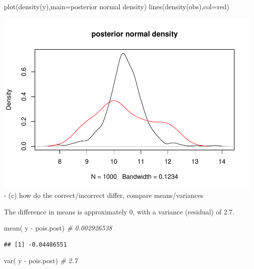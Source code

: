 \documentclass[
]{book}
\newenvironment{Shaded}{\begin{snugshade}}{\end{snugshade}}
\newcommand{\AttributeTok}[1]{\textcolor[rgb]{0.77,0.63,0.00}{#1}}
\newcommand{\CommentTok}[1]{\textcolor[rgb]{0.56,0.35,0.01}{\textit{#1}}}
\newcommand{\FunctionTok}[1]{\textcolor[rgb]{0.00,0.00,0.00}{#1}}
\newcommand{\NormalTok}[1]{#1}
\newcommand{\SpecialCharTok}[1]{\textcolor[rgb]{0.00,0.00,0.00}{#1}}
\newcommand{\StringTok}[1]{\textcolor[rgb]{0.31,0.60,0.02}{#1}}
\theoremstyle{definition}
\theoremstyle{definition}
\theoremstyle{definition}
\theoremstyle{definition}
\theoremstyle{remark}
\begin{document}
\begin{Shaded}
\begin{Highlighting}[]
  \FunctionTok{plot}\NormalTok{(}\FunctionTok{density}\NormalTok{(y),}\AttributeTok{main=}\StringTok{\textquotesingle{}posterior normal density\textquotesingle{}}\NormalTok{)}
  \FunctionTok{lines}\NormalTok{(}\FunctionTok{density}\NormalTok{(obs),}\AttributeTok{col=}\StringTok{\textquotesingle{}red\textquotesingle{}}\NormalTok{)}
\end{Highlighting}
\end{Shaded}

\includegraphics{_main_files/figure-latex/unnamed-chunk-40-2.pdf}
- (c) how do the correct/incorrect differ, compare means/variances

The difference in means is approximately 0, with a variance (residual) of 2.7.

\begin{Shaded}
\begin{Highlighting}[]
 \FunctionTok{mean}\NormalTok{( y }\SpecialCharTok{{-}}\NormalTok{ pois.post) }\CommentTok{\# 0.002926538}
\end{Highlighting}
\end{Shaded}

\begin{verbatim}
## [1] -0.04486551
\end{verbatim}

\begin{Shaded}
\begin{Highlighting}[]
 \FunctionTok{var}\NormalTok{( y }\SpecialCharTok{{-}}\NormalTok{ pois.post) }\CommentTok{\# 2.7}
\end{Highlighting}
\end{Shaded}
\end{document}
